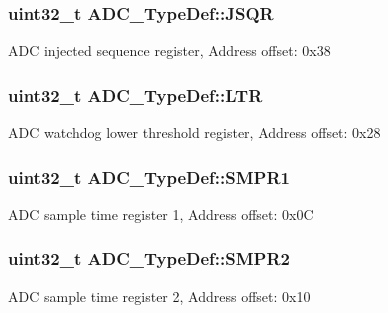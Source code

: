 \subsubsection[{\texorpdfstring{J\+S\+QR}{JSQR}}]{ uint32\+\_\+t A\+D\+C\+\_\+\+Type\+Def\+::\+J\+S\+QR}\hypertarget{struct_a_d_c___type_def_a5438a76a93ac1bd2526e92ef298dc193}{}\label{struct_a_d_c___type_def_a5438a76a93ac1bd2526e92ef298dc193}
A\+DC injected sequence register, Address offset\+: 0x38 
\subsubsection[{\texorpdfstring{L\+TR}{LTR}}]{ uint32\+\_\+t A\+D\+C\+\_\+\+Type\+Def\+::\+L\+TR}\hypertarget{struct_a_d_c___type_def_afdaf8050fb01739206a92c9ad610f396}{}\label{struct_a_d_c___type_def_afdaf8050fb01739206a92c9ad610f396}
A\+DC watchdog lower threshold register, Address offset\+: 0x28 
\subsubsection[{\texorpdfstring{S\+M\+P\+R1}{SMPR1}}]{ uint32\+\_\+t A\+D\+C\+\_\+\+Type\+Def\+::\+S\+M\+P\+R1}\hypertarget{struct_a_d_c___type_def_a73009a8122fcc628f467a4e997109347}{}\label{struct_a_d_c___type_def_a73009a8122fcc628f467a4e997109347}
A\+DC sample time register 1, Address offset\+: 0x0C 
\subsubsection[{\texorpdfstring{S\+M\+P\+R2}{SMPR2}}]{ uint32\+\_\+t A\+D\+C\+\_\+\+Type\+Def\+::\+S\+M\+P\+R2}\hypertarget{struct_a_d_c___type_def_a9e68fe36c4c8fbbac294b5496ccf7130}{}\label{struct_a_d_c___type_def_a9e68fe36c4c8fbbac294b5496ccf7130}
A\+DC sample time register 2, Address offset\+: 0x10 
